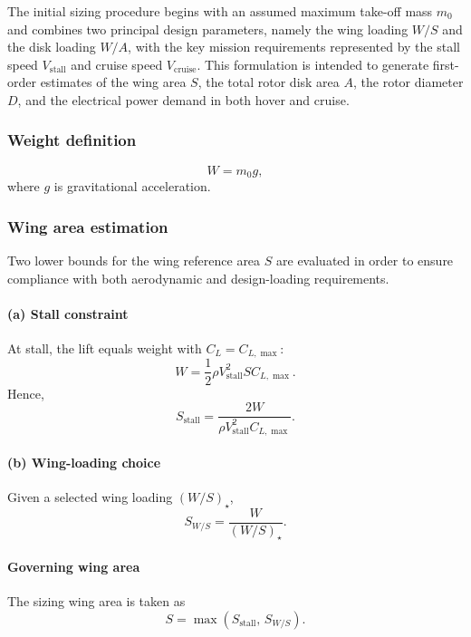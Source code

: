 \documentclass[11pt, a4paper]{article}
\begin{document}
The initial sizing procedure begins with an assumed maximum take-off mass $m_0$ and combines two principal design parameters, namely the wing loading $W/S$ and the disk loading $W/A$, with the key mission requirements represented by the stall speed $V_\mathrm{stall}$ and cruise speed $V_\mathrm{cruise}$. This formulation is intended to generate first-order estimates of the wing area $S$, the total rotor disk area $A$, the rotor diameter $D$, and the electrical power demand in both hover and cruise.

\subsubsection{Weight definition}
\begin{equation}
W = m_0 g ,
\end{equation}
where $g$ is gravitational acceleration.

\subsubsection{Wing area estimation}
Two lower bounds for the wing reference area $S$ are evaluated in order to ensure compliance with both aerodynamic and design-loading requirements.

\paragraph{(a) Stall constraint}
At stall, the lift equals weight with $C_L=C_{L,\max}$:
\begin{equation}
W=\frac{1}{2}\rho V_\mathrm{stall}^2 S C_{L,\max}.
\end{equation}
Hence,
\begin{equation}
S_\mathrm{stall}=\frac{2W}{\rho V_\mathrm{stall}^2 C_{L,\max}} .
\end{equation}

\paragraph{(b) Wing-loading choice}
Given a selected wing loading $(W/S)_\star$,
\begin{equation}
S_{W/S}=\frac{W}{(W/S)_\star}.
\end{equation}

\paragraph{Governing wing area}
The sizing wing area is taken as
\begin{equation}
S=\max\left(S_\mathrm{stall},\, S_{W/S}\right).
\end{equation}
\end{document}
